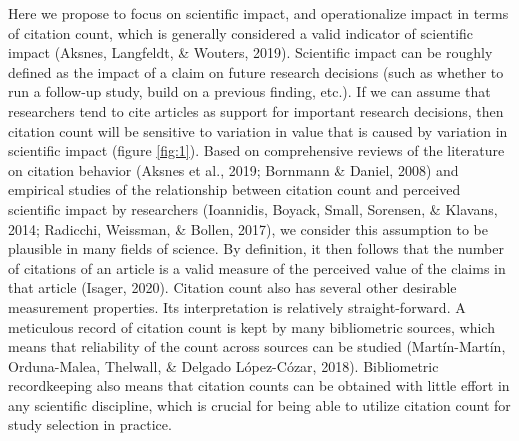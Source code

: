 \documentclass[
  english,
  man,floatsintext]{apa6}
\begin{document}
Here we propose to focus on scientific impact, and operationalize impact in terms of citation count, which is generally considered a valid indicator of scientific impact (Aksnes, Langfeldt, \& Wouters, 2019). Scientific impact can be roughly defined as the impact of a claim on future research decisions (such as whether to run a follow-up study, build on a previous finding, etc.). If we can assume that researchers tend to cite articles as support for important research decisions, then citation count will be sensitive to variation in value that is caused by variation in scientific impact (figure \ref{fig:1}). Based on comprehensive reviews of the literature on citation behavior (Aksnes et al., 2019; Bornmann \& Daniel, 2008) and empirical studies of the relationship between citation count and perceived scientific impact by researchers (Ioannidis, Boyack, Small, Sorensen, \& Klavans, 2014; Radicchi, Weissman, \& Bollen, 2017), we consider this assumption to be plausible in many fields of science. By definition, it then follows that the number of citations of an article is a valid measure of the perceived value of the claims in that article (Isager, 2020). Citation count also has several other desirable measurement properties. Its interpretation is relatively straight-forward. A meticulous record of citation count is kept by many bibliometric sources, which means that reliability of the count across sources can be studied (Martín-Martín, Orduna-Malea, Thelwall, \& Delgado López-Cózar, 2018). Bibliometric recordkeeping also means that citation counts can be obtained with little effort in any scientific discipline, which is crucial for being able to utilize citation count for study selection in practice.
\end{document}
